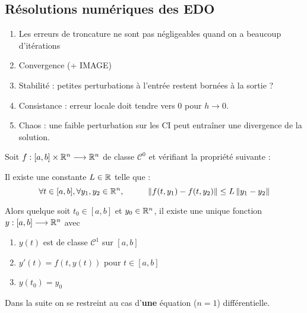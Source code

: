 \subsection*{Résolutions numériques des EDO}
\begin{enumerate}[label=*]
    \item Les erreurs de troncature ne sont pas négligeables quand on a beaucoup d'itérations
    \item Convergence (+ IMAGE)
    \item Stabilité : petites perturbations à l'entrée restent bornées à la sortie ?
    \item Consistance : erreur locale doit tendre vers 0 pour $h \to 0$.
    \item Chaos : une faible perturbation sur les CI peut entraîner une divergence de la solution.
\end{enumerate}

\begin{ftheo}
    Soit $f : [a,b] \times \mathbb{R}^n \longrightarrow \mathbb{R}^n$ de classe $\mathcal{C}^0$ et vérifiant
    la propriété suivante :

    Il existe une constante $L \in \mathbb{R}$ telle que :
        \begin{equation*}
            \forall t \in [a,b], \forall y_1, y_2 \in \mathbb{R}^n, \hspace{1cm} \left\lVert f(t,y_1) - f(t,y_2)\right\rVert \leq L \left\lVert y_1 - y_2\right\rVert
        \end{equation*}

        Alors quelque soit $t_0 \in [a,b]$ et $y_0 \in \mathbb{R}^n$, il existe une unique fonction
        $y : [a,b] \longrightarrow \mathbb{R}^n$ avec
    \begin{enumerate}[label=(\roman*)]
        \item $y(t)$ est de classe $\mathcal{C}^1$ sur $[a,b]$
        \item $y'(t) = f(t,y(t))$ pour $t \in [a,b]$
        \item $y(t_0) = y_0$
    \end{enumerate}
\end{ftheo}

Dans la suite on se restreint au cas d'\textbf{une} équation ($n=1$) différentielle.
\vspace{0.5cm}

